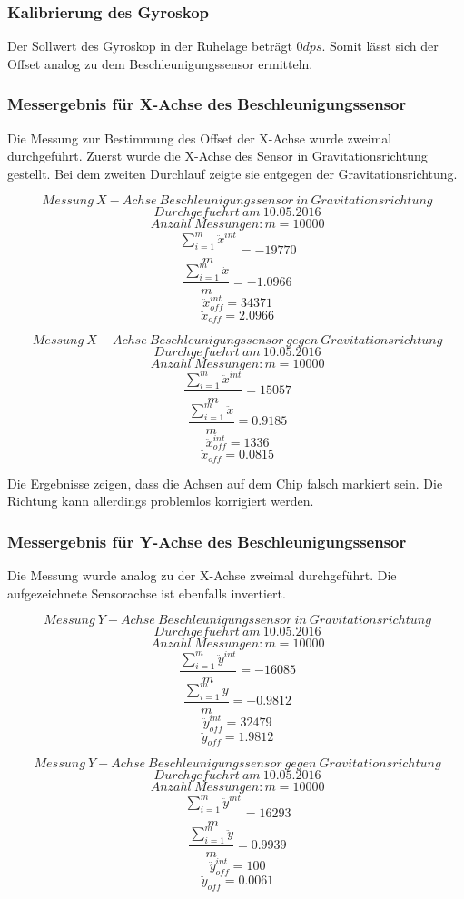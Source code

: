 \documentclass{article}
\begin{document}
\subsubsection{Kalibrierung des Gyroskop}
Der Sollwert des Gyroskop in der Ruhelage beträgt $0 dps$. Somit lässt sich der Offset analog zu dem Beschleunigungssensor ermitteln.

\subsubsection{Messergebnis für X-Achse des Beschleunigungssensor}
Die Messung zur Bestimmung des Offset der X-Achse wurde zweimal durchgeführt. Zuerst wurde die X-Achse des Sensor in Gravitationsrichtung gestellt. Bei dem zweiten Durchlauf zeigte sie entgegen der Gravitationsrichtung.

\[\ Messung \ X-Achse \ Beschleunigungssensor \ in \ Gravitationsrichtung \]
\[\ Durchgefuehrt \ am \ 10.05.2016 \]
\[\ Anzahl \ Messungen : m = 10000 \]
\[\ \frac{\sum_{i = 1}^{m} \ddot{x}^{int}}{m} = -19770 \]
\[\ \frac{\sum_{i = 1}^{m} \ddot{x}}{m} = -1.0966 \]
\[\ \ddot{x}_{off}^{int} = 34371 \]
\[\ \ddot{x}_{off} = 2.0966 \]

\[\ Messung \ X-Achse \ Beschleunigungssensor \ gegen \ Gravitationsrichtung \]
\[\ Durchgefuehrt \ am \ 10.05.2016 \]
\[\ Anzahl \ Messungen : m = 10000 \]
\[\ \frac{\sum_{i = 1}^{m} \ddot{x}^{int}}{m} = 15057 \]
\[\ \frac{\sum_{i = 1}^{m} \ddot{x}}{m} = 0.9185 \]
\[\ \ddot{x}_{off}^{int} = 1336 \]
\[\ \ddot{x}_{off} = 0.0815 \]

Die Ergebnisse zeigen, dass die Achsen auf dem Chip falsch markiert sein. Die Richtung kann allerdings problemlos korrigiert werden.

\subsubsection{Messergebnis für Y-Achse des Beschleunigungssensor}
Die Messung wurde analog zu der X-Achse zweimal durchgeführt. Die aufgezeichnete Sensorachse ist ebenfalls invertiert.

\[\ Messung \ Y-Achse \ Beschleunigungssensor \ in \ Gravitationsrichtung \]
\[\ Durchgefuehrt \ am \ 10.05.2016 \]
\[\ Anzahl \ Messungen : m = 10000 \]
\[\ \frac{\sum_{i = 1}^{m} \ddot{y}^{int}}{m} = -16085 \]
\[\ \frac{\sum_{i = 1}^{m} \ddot{y}}{m} = -0.9812 \]
\[\ \ddot{y}_{off}^{int} = 32479 \]
\[\ \ddot{y}_{off} = 1.9812 \]


\[\ Messung \ Y-Achse \ Beschleunigungssensor \ gegen \ Gravitationsrichtung \]
\[\ Durchgefuehrt \ am \ 10.05.2016 \]
\[\ Anzahl \ Messungen : m = 10000 \]
\[\ \frac{\sum_{i = 1}^{m} \ddot{y}^{int}}{m} = 16293 \]
\[\ \frac{\sum_{i = 1}^{m} \ddot{y}}{m} = 0.9939 \]
\[\ \ddot{y}_{off}^{int} = 100 \]
\[\ \ddot{y}_{off} = 0.0061 \]
\end{document}

